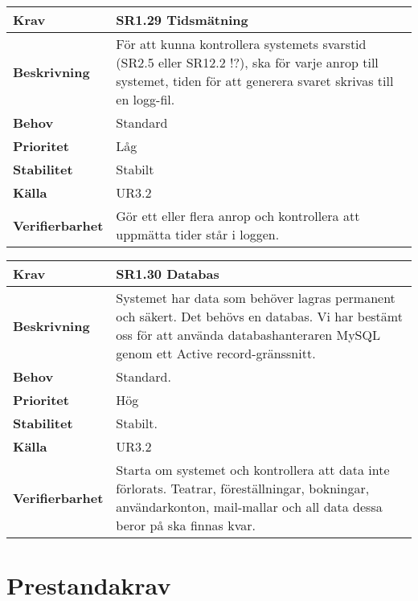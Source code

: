 \documentclass[a4paper, twoside, 11pt, titlepage]{article}
\begin{document}
	\begin{tabular} { p{2.6cm} p{12.5cm} }
		\hline
		\sffamily\textbf{Krav} & \sffamily\textbf{SR1.29 Tidsmätning } \\
		\hline
		\sffamily\textbf{Beskrivning} & För att kunna kontrollera systemets svarstid (SR2.5 eller SR12.2 !?), ska för varje anrop till systemet, tiden för att generera svaret skrivas till en logg-fil.  \\
		\hline
		\sffamily\textbf{Behov} & Standard  \\
		\hline
		\sffamily\textbf{Prioritet} & Låg  \\
		\hline
		\sffamily\textbf{Stabilitet} & Stabilt  \\
		\hline
		\sffamily\textbf{Källa} & UR3.2  \\
		\hline
		\sffamily\textbf{Verifierbarhet} & Gör ett eller flera anrop och kontrollera att uppmätta tider står i loggen.  \\
		\hline
	\end{tabular}
	\vspace{6mm}

	\begin{tabular} { p{2.6cm} p{12.5cm} }
		\hline
		\sffamily\textbf{Krav} & \sffamily\textbf{SR1.30 Databas } \\
		\hline
		\sffamily\textbf{Beskrivning} & Systemet har data som behöver lagras permanent och säkert. Det behövs en databas. Vi har bestämt oss för att använda databashanteraren MySQL genom ett Active record-gränssnitt.  \\
		\hline
		\sffamily\textbf{Behov} & Standard.  \\
		\hline
		\sffamily\textbf{Prioritet} & Hög  \\
		\hline
		\sffamily\textbf{Stabilitet} & Stabilt.  \\
		\hline
		\sffamily\textbf{Källa} & UR3.2  \\
		\hline
		\sffamily\textbf{Verifierbarhet} & Starta om systemet och kontrollera att data inte förlorats. Teatrar, föreställningar, bokningar, användarkonton, mail-mallar och all data dessa beror på ska finnas kvar.  \\
		\hline
	\end{tabular}


\clearpage
\section{Prestandakrav}
\end{document}
